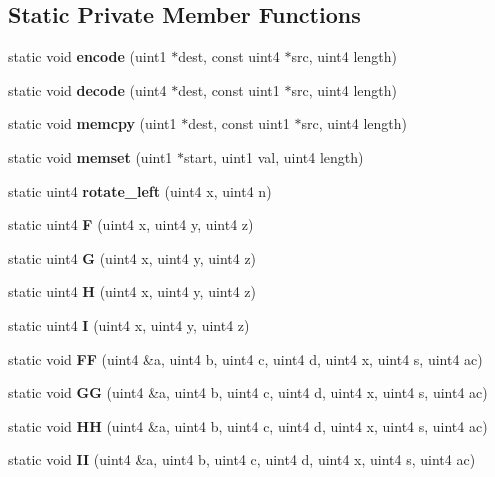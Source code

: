 \subsection*{Static Private Member Functions}
\begin{DoxyCompactItemize}
\item 
static void {\bfseries encode} (uint1 $\ast$dest, const uint4 $\ast$src, uint4 length)\label{classMD5_aeacf39bf24a425d4eaf035466e0ee009}

\item 
static void {\bfseries decode} (uint4 $\ast$dest, const uint1 $\ast$src, uint4 length)\label{classMD5_a0aeb8e4141d80e9b33e5fcab91f797e6}

\item 
static void {\bfseries memcpy} (uint1 $\ast$dest, const uint1 $\ast$src, uint4 length)\label{classMD5_a5db7422eee66dd26ef731b8e783951b7}

\item 
static void {\bfseries memset} (uint1 $\ast$start, uint1 val, uint4 length)\label{classMD5_ae2affb1e7d58a204d9ae367ea7b51c36}

\item 
static uint4 {\bfseries rotate\_\-left} (uint4 x, uint4 n)\label{classMD5_a64f84f0aef8679b0c77858e0c59822b9}

\item 
static uint4 {\bfseries F} (uint4 x, uint4 y, uint4 z)\label{classMD5_a2934208483fbd86327076a11ded14971}

\item 
static uint4 {\bfseries G} (uint4 x, uint4 y, uint4 z)\label{classMD5_a9abb73967eb7219c23faf69a4e80eb71}

\item 
static uint4 {\bfseries H} (uint4 x, uint4 y, uint4 z)\label{classMD5_af0a3d0593a4a4fc964a8d5beb2348bbc}

\item 
static uint4 {\bfseries I} (uint4 x, uint4 y, uint4 z)\label{classMD5_ab363834e0160109ba1c7aaf53409e7c1}

\item 
static void {\bfseries FF} (uint4 \&a, uint4 b, uint4 c, uint4 d, uint4 x, uint4 s, uint4 ac)\label{classMD5_a31479b157441ace2dbc2ae0edd0d2e38}

\item 
static void {\bfseries GG} (uint4 \&a, uint4 b, uint4 c, uint4 d, uint4 x, uint4 s, uint4 ac)\label{classMD5_a8ebdbe52608e522516d1759a31753212}

\item 
static void {\bfseries HH} (uint4 \&a, uint4 b, uint4 c, uint4 d, uint4 x, uint4 s, uint4 ac)\label{classMD5_aaad039caf0b33abf1bf3f3589166543c}

\item 
static void {\bfseries II} (uint4 \&a, uint4 b, uint4 c, uint4 d, uint4 x, uint4 s, uint4 ac)\label{classMD5_a7af0184654644964ecdb57b1203e5ec7}

\end{DoxyCompactItemize}
